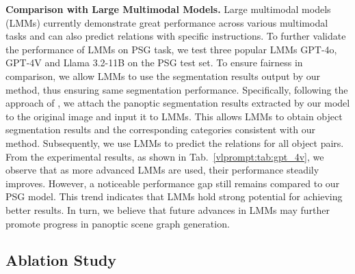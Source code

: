 \noindent \textbf{Comparison with Large Multimodal Models.}
Large multimodal models (LMMs) currently demonstrate great performance across various multimodal tasks and can also predict relations with specific instructions.
To further validate the performance of LMMs on PSG task, we test three popular LMMs GPT-4o, GPT-4V and Llama 3.2-11B on the PSG test set.
To ensure fairness in comparison, we allow LMMs to use the segmentation results output by our method, thus ensuring same segmentation performance.
Specifically, following the approach of \citet{yang2023setofmark}, we attach the panoptic segmentation results extracted by our model to the original image and input it to LMMs.
This allows LMMs to obtain object segmentation results and the corresponding categories consistent with our method.
Subsequently, we use LMMs to predict the relations for all object pairs.
From the experimental results, as shown in Tab.~\ref{vlprompt:tab:gpt_4v}, we observe that as more advanced LMMs are used, their performance steadily improves.
However, a noticeable performance gap still remains compared to our PSG model.
This trend indicates that LMMs hold strong potential for achieving better results.
In turn, we believe that future advances in LMMs may further promote progress in panoptic scene graph generation.

\begin{table}[!t]
    \centering
    \setlength{\tabcolsep}{2.8mm}
    \caption{Comparison with LMMs in PSG task.
    Large multimodal models like GPT-4V, not tailored for PSG task, underperform compared to task-specific PSG models.}
    \label{vlprompt:tab:gpt_4v}
\end{table}


\subsection{Ablation Study}

